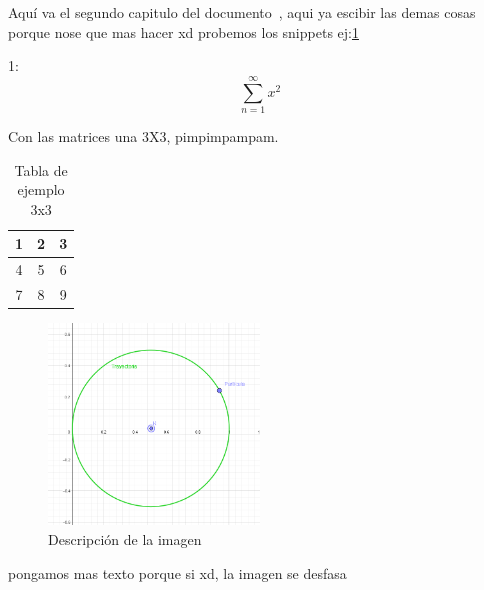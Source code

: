 Aquí va el segundo capitulo del documento~\cite{martin1988estudio}, aqui ya escibir las demas cosas porque nose que mas hacer xd 
probemos los snippets ej:\ref{tab:ejemplo_3x3} 

1:
\begin{equation}
    \sum_{n = 1}^{\infty} x^2 
\end{equation}


Con las matrices una 3X3, pimpimpampam.
\begin{table}[ht]
\centering
\begin{tabular}{|c|c|c|}
\hline
1 & 2 & 3 \\ \hline
4 & 5 & 6 \\ \hline
7 & 8 & 9 \\ \hline
\end{tabular}
\caption{Tabla de ejemplo 3x3}
\label{tab:ejemplo_3x3}
\end{table}

\begin{figure}[H]
\centering
\includegraphics[width=0.5\textwidth]{Imagenes/Captura de pantalla 2024-11-29 113246.png}
\caption{Descripción de la imagen}
\label{fig:ejemplo_imagen}
\end{figure}

pongamos mas texto porque si xd, la imagen se desfasa 